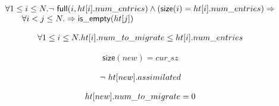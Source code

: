 \begin{lemma}
  \begin{equation*}
\begin{array}{l}        
  \forall 1 \leq i \leq N.  \mbox{$\neg\ \mathsf{full}(i,
    \mbox{$ht[i]$}.num\_entries)$} \wedge (\mathsf{size}(i) =
  \mbox{$ht[i]$}.num\_entries) \Rightarrow \\
  \quad \quad  \forall i < j \leq N.  \Rightarrow \mathsf{is\_empty}(\mbox{$ht[j]$})
\end{array}
\end{equation*} 
\label{empty_beyond_non_full}
\end{lemma}

\begin{lemma}
  \begin{equation*}
\begin{array}{l}        
  \forall 1 \leq i \leq N. \mbox{$ht[i]$}.num\_to\_migrate \leq \mbox{$ht[i]$}.num\_entries
\end{array}
\end{equation*}  
\label{num_to_migrate_and_num_entries}
\end{lemma}  

\begin{lemma}
  \begin{equation*}
\begin{array}{l}        
  \mathsf{size}(new) = cur\_sz
\end{array}
\end{equation*}  
\label{table_sizes}
\end{lemma}  

\begin{lemma}
  \begin{equation*}
\begin{array}{l}        
  \mbox{$\neg\ \mbox{$ht[new]$}.assimilated$}
\end{array}
\end{equation*}  
\label{new_cannot_be_assimilated}
\end{lemma}  

\begin{lemma}
  \begin{equation*}
\begin{array}{l}      
  \mbox{$ht[new]$}.num\_to\_migrate = 0
\end{array}
\end{equation*}  
\label{new_cannot_migrate}
\end{lemma}  

